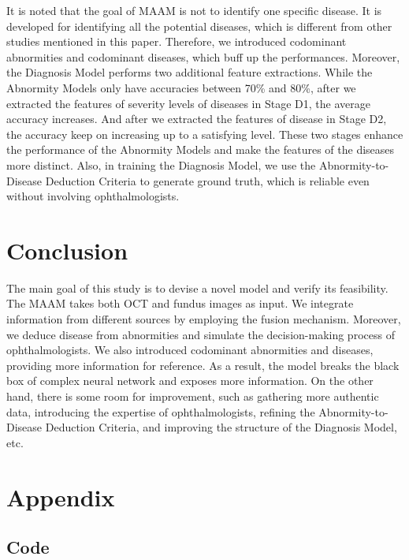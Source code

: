 \documentclass{article}
\begin{document}
	It is noted that the goal of MAAM is not to identify one specific disease.  It is developed for identifying all the potential diseases, which is different from other studies mentioned in this paper.  Therefore, we introduced codominant abnormities and codominant diseases, which buff up the performances. Moreover, the Diagnosis Model performs two additional feature extractions. While the Abnormity Models only have accuracies between 70\% and 80\%, after we extracted the features of severity levels of diseases in Stage D1, the average accuracy increases. And after we extracted the features of disease in Stage D2, the accuracy keep on increasing up to a satisfying level. These two stages enhance the performance of the Abnormity Models and make the features of the diseases more distinct.	Also, in training the Diagnosis Model, we use the Abnormity-to-Disease Deduction Criteria to generate ground truth, which is reliable even without involving ophthalmologists.
	
	\section{Conclusion}
	
	The main goal of this study is to devise a novel model and verify its feasibility. The MAAM takes both OCT and fundus images as input. We integrate information from different sources by employing the fusion mechanism. Moreover, we deduce disease from abnormities and simulate the decision-making process of ophthalmologists. We also introduced codominant abnormities and diseases, providing more information for reference. As a result, the model breaks the black box of complex neural network and exposes more information. On the other hand, there is some room for improvement, such as gathering more authentic data, introducing the expertise of ophthalmologists, refining the Abnormity-to-Disease Deduction Criteria, and improving the structure of the Diagnosis Model, etc.
	
	\newrefcontext[sorting=nyt]
	\printbibliography
	
	\pagebreak
	\section*{Appendix}
	
	\subsection*{Code}
	
\end{document}
